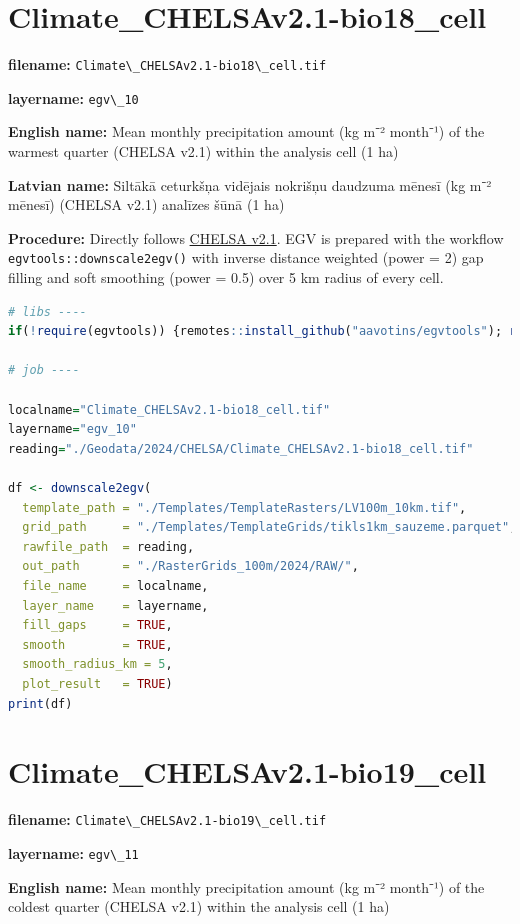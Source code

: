 \documentclass[
]{book}
\newcommand{\passthrough}[1]{#1}
\begin{document}
\section{Climate\_CHELSAv2.1-bio18\_cell}\label{ch06.010}

\textbf{filename:} \passthrough{\lstinline!Climate\_CHELSAv2.1-bio18\_cell.tif!}

\textbf{layername:} \passthrough{\lstinline!egv\_10!}

\textbf{English name:} Mean monthly precipitation amount (kg m⁻² month⁻¹) of the warmest quarter (CHELSA v2.1) within the analysis cell (1 ha)

\textbf{Latvian name:} Siltākā ceturkšņa vidējais nokrišņu daudzuma mēnesī (kg m⁻² mēnesī) (CHELSA v2.1) analīzes šūnā (1 ha)

\textbf{Procedure:} Directly follows \hyperref[Ch04.11]{CHELSA v2.1}. EGV is prepared with the
workflow \passthrough{\lstinline!egvtools::downscale2egv()!} with inverse distance weighted (power = 2)
gap filling and soft smoothing (power = 0.5) over 5 km radius of every cell.

\begin{lstlisting}[language=R]
# libs ----
if(!require(egvtools)) {remotes::install_github("aavotins/egvtools"); require(egvtools)}

# job ----

localname="Climate_CHELSAv2.1-bio18_cell.tif"
layername="egv_10"
reading="./Geodata/2024/CHELSA/Climate_CHELSAv2.1-bio18_cell.tif"

df <- downscale2egv(
  template_path = "./Templates/TemplateRasters/LV100m_10km.tif",
  grid_path     = "./Templates/TemplateGrids/tikls1km_sauzeme.parquet",
  rawfile_path  = reading,
  out_path      = "./RasterGrids_100m/2024/RAW/",
  file_name     = localname,
  layer_name    = layername,
  fill_gaps     = TRUE,
  smooth        = TRUE,
  smooth_radius_km = 5,
  plot_result   = TRUE)
print(df)
\end{lstlisting}

\section{Climate\_CHELSAv2.1-bio19\_cell}\label{ch06.011}

\textbf{filename:} \passthrough{\lstinline!Climate\_CHELSAv2.1-bio19\_cell.tif!}

\textbf{layername:} \passthrough{\lstinline!egv\_11!}

\textbf{English name:} Mean monthly precipitation amount (kg m⁻² month⁻¹) of the coldest quarter (CHELSA v2.1) within the analysis cell (1 ha)
\end{document}
